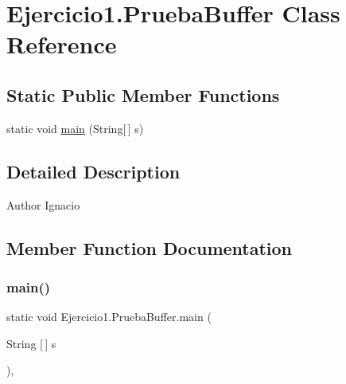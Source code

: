 \hypertarget{class_ejercicio1_1_1_prueba_buffer}{}\section{Ejercicio1.\+Prueba\+Buffer Class Reference}
\label{class_ejercicio1_1_1_prueba_buffer}
\subsection*{Static Public Member Functions}
\begin{DoxyCompactItemize}
\item 
static void \mbox{\hyperlink{class_ejercicio1_1_1_prueba_buffer_a2d41e4205314a1a5be6b3873352ac52a}{main}} (String\mbox{[}$\,$\mbox{]} s)
\end{DoxyCompactItemize}


\subsection{Detailed Description}
\begin{DoxyAuthor}{Author}
Ignacio 
\end{DoxyAuthor}


\subsection{Member Function Documentation}
\mbox{\label{class_ejercicio1_1_1_prueba_buffer_a2d41e4205314a1a5be6b3873352ac52a}} 
\subsubsection{\texorpdfstring{main()}{main()}}
{\footnotesize\ttfamily static void Ejercicio1.\+Prueba\+Buffer.\+main (\begin{DoxyParamCaption}\item[{String \mbox{[}$\,$\mbox{]}}]{s }\end{DoxyParamCaption})\hspace{0.3cm}{\ttfamily [inline]}, {\ttfamily [static]}}


